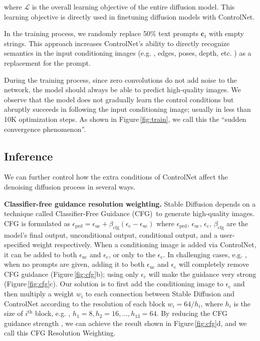 where $\mathcal{L}$ is the overall learning objective of the entire diffusion model. This learning objective is directly used in finetuning diffusion models with ControlNet.

	In the training process, we randomly replace 50\% text prompts
	$\bm{c}_t$ with empty strings. This approach increases ControlNet's ability to directly recognize semantics in the input conditioning images (e.g. , edges, poses, depth, etc. ) as a replacement for the prompt.

	During the training process, since zero convolutions do not add noise to the network, the model should always be able to predict high-quality images. We observe that the model does not gradually learn the control conditions but abruptly succeeds in following the input conditioning image; usually in less than 10K optimization steps. As shown in Figure\,\ref{fig:train}, we call this the ``sudden convergence phenomenon''.

	\subsection{Inference}
	\label{sec:infer}

	We can further control how the extra conditions of ControlNet affect the denoising diffusion process in several ways.

	\textbf{Classifier-free guidance resolution weighting.} Stable Diffusion depends on a technique called Classifier-Free Guidance
	(CFG)\,\cite{cfg} to generate high-quality images. CFG is formulated as
	$\epsilon_\text{prd}=\epsilon_\text{uc}+\beta_\text{cfg}(\epsilon_\text{c}-\epsilon_\text{uc})$
	where
	$\epsilon_\text{prd}$, $\epsilon_\text{uc}$, $\epsilon_\text{c}$, $\beta_\text{cfg}$
	are the model's final output, unconditional output, conditional output, and a user-specified weight respectively. When a conditioning image is added via ControlNet, it can be added to both $\epsilon_\text{uc}$ and
	$\epsilon_\text{c}$, or only to the $\epsilon_\text{c}$. In challenging cases, e.g. , when no prompts are given, adding it to both
	$\epsilon_\text{uc}$ and $\epsilon_\text{c}$ will completely remove CFG guidance (Figure\,\ref{fig:cfg}b); using only $\epsilon_\text{c}$ will make the guidance very strong (Figure\,\ref{fig:cfg}c). Our solution is to first add the conditioning image to $\epsilon_\text{c}$ and then multiply a weight $w_i$ to each connection between Stable Diffusion and ControlNet according to the resolution of each block $w_i=64/h_i$, where $h_i$ is the size of
	$i^\text{th}$ block, e.g. , $h_1=8, h_2=16, ..., h_{13}=64$.  By reducing the CFG guidance strength , we can achieve the result shown in
	Figure\,\ref{fig:cfg}d, and we call this CFG Resolution Weighting.

